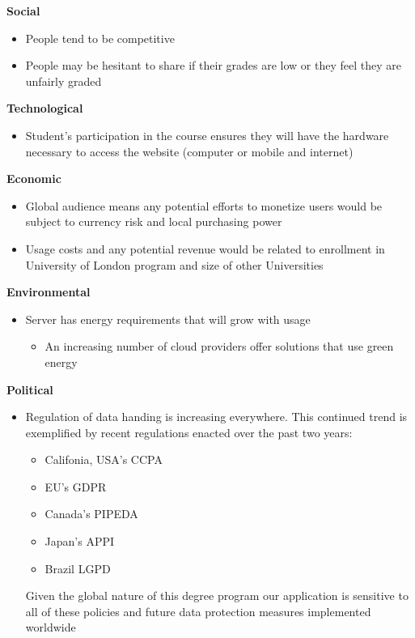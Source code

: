 \noindent \textbf{Social}
\begin{itemize}
    \item People tend to be competitive \cite{hutson_2015}
    \item People may be hesitant to share if their grades are low or they feel they are unfairly graded
\end{itemize}
\textbf{Technological}
\begin{itemize}
    \item Student's participation in the course ensures they will have the hardware necessary to access the website (computer or mobile and internet)
\end{itemize}
\textbf{Economic}
\begin{itemize}
    \item Global audience means any potential efforts to monetize users would be subject to currency risk and local purchasing power
    \item Usage costs and any potential revenue would be related to enrollment in University of London program and size of other Universities
\end{itemize}
\textbf{Environmental}
\begin{itemize}
    \item Server has energy requirements that will grow with usage
    \begin{itemize}
        \item An increasing number of cloud providers offer solutions that use green energy
\end{itemize}
\end{itemize}
\textbf{Political}
\begin{itemize}
    \item Regulation of data handing is increasing everywhere. This continued trend is exemplified by recent regulations enacted over the past two years:
    \begin{itemize}
        \item Califonia, USA's CCPA
        \item EU's GDPR
        \item Canada's PIPEDA
        \item Japan's APPI 
        \item Brazil LGPD
    \end{itemize}
    Given the global nature of this degree program our application is sensitive to all of these policies and future data protection measures implemented worldwide
\end{itemize}
